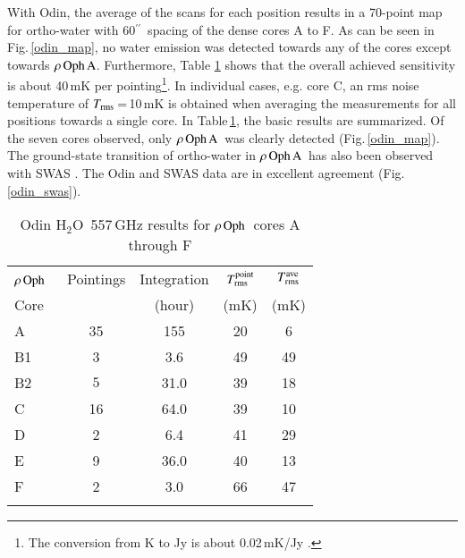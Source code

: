 \documentclass{aa}
\newcommand{\trms}{$T_{\rm rms}$}
\newcommand{\water}{H$_{2}$O}
\newcommand{\ro}{$\rho \, {\rm Oph}$}
\newcommand{\roa}{$\rho \, {\rm Oph \, A}$}
\newcommand{\asec}{$^{\prime \prime}$}
\begin{document}
With Odin, the average of the scans for each position results in a 70-point map for ortho-water with 60\asec\ spacing of the dense cores A to F. As can be seen in Fig.\,\ref{odin_map}, no water emission was detected towards any of the cores except towards \roa. Furthermore, Table \ref{avespectab} shows that the overall achieved sensitivity is about 40\,mK per pointing\footnote{The conversion from K to Jy is about 0.02\,mK/Jy \citep{sandqvist2003}.}. In individual cases, e.g. core C, an rms noise temperature of \trms\,=\,10\,mK is obtained when averaging the measurements for all positions towards a single core.  In Table\,\ref{avespectab}, the basic results are summarized. Of the seven cores observed, only \roa\ was clearly detected (Fig.\,\ref{odin_map}). The ground-state transition of ortho-water in \roa\ has also been observed with SWAS \citep{ashby2000,snell2000}. The Odin and SWAS data are in excellent agreement (Fig.\,\ref{odin_swas}).


\begin{table}[ht]
  \caption[]{Odin \water\, 557\,GHz results for \ro\ cores A through F}
  \label{avespectab}
  \centering          
  \begin{tabular}{lcccc}     %
  \hline\hline        
       \noalign{\smallskip}     
       \ro\       &  Pointings          & Integration   & $T_{\rm rms}^{\rm point}$& $T_{\rm rms}^{\rm ave}$ \\
        Core    &                               & (hour)        & (mK)           & (mK)       \\
       \noalign{\smallskip}
       \hline
       \noalign{\smallskip}
       A        &   35                                & 155       & 20                  & \phantom{1}6  \\
       B1       & \phantom{1}3          & 3.6   & 49            & 49  \\
       B2       & \phantom{1} $\!5$             & 31.0          & 39            & 18  \\
       C        & 16                                    & 64.0          & 39              & 10  \\
       D        &  \phantom{1}2                 & 6.4           & 41            & 29  \\
       E        &  \phantom{1}9                 & 36.0          & 40            & 13  \\
       F        &  \phantom{1}2                 & 3.0   & 66            & 47  \\
       \noalign{\smallskip}
       \hline
\end{tabular}
\end{table}
\end{document}
